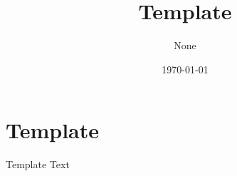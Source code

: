\documentclass{article}
\title{Template}
\author{None}
\date{\today}
\begin{document}
\maketitle



\section{Template}
Template Text


\newpage
\printbibliography
\newpage
\end{document}
